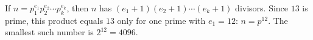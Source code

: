 If $n=p_1^{e_1}p_2^{e_2}\cdots p_k^{e_k}$, then $n$ has $(e_1+1)(e_2+1)\cdots(e_k+1)$ divisors. Since $13$ is prime, this product equals $13$ only for one prime with $e_1=12$: $n=p^{12}$. The smallest such number is $2^{12}=\boxed{4096}$.
